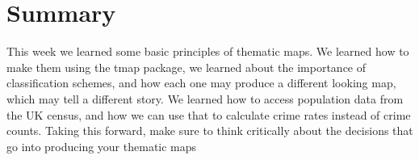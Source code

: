 \documentclass[
]{book}
\begin{document}
\hypertarget{summary-2}{%
\section{Summary}\label{summary-2}}

This week we learned some basic principles of thematic maps. We learned how to make them using the tmap package, we learned about the importance of classification schemes, and how each one may produce a different looking map, which may tell a different story. We learned how to access population data from the UK census, and how we can use that to calculate crime rates instead of crime counts. Taking this forward, make sure to think critically about the decisions that go into producing your thematic maps

  
\end{document}
